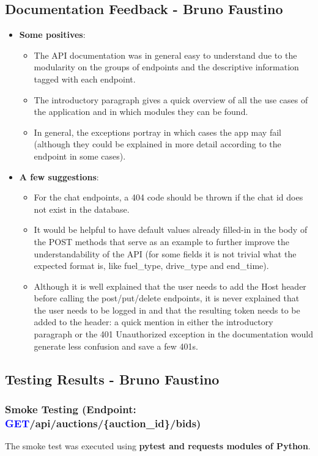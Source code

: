 \documentclass[11pt,a4paper]{article}
\newcommand{\getapi}{\textcolor{blue}{GET}}
\newcommand{\bff}[1]{\textbf{#1}}
\begin{document}
 \subsection{Documentation Feedback - Bruno Faustino}
 \begin{itemize}
  \item \bff{Some positives}:
  \begin{itemize}
   \item The API documentation was in general easy to understand due to the modularity on the groups of endpoints and the descriptive information tagged with each endpoint.
   \item The introductory paragraph gives a quick overview of all the use cases of the application and in which modules they can be found.
   \item In general, the exceptions portray in which cases the app may fail (although they could be explained in more detail according to the endpoint in some cases).
  \end{itemize}
  \item \bff{A few suggestions}:
  \begin{itemize}
   \item For the chat endpoints, a 404 code should be thrown if the chat id does not exist in the database.
   \item It would be helpful to have default values already filled-in in the body of the POST methods that serve as an example to further improve the understandability of the API (for some fields it is not trivial what the expected format is, like fuel\_type, drive\_type and end\_time).
   \item Although it is well explained that the user needs to add the Host header before calling the post/put/delete endpoints, it is never explained that the user needs to be logged in and that the resulting token needs to be added to the header: a quick mention in either the introductory paragraph or the 401 Unauthorized exception in the documentation would generate less confusion and save a few 401s.
  \end{itemize}
 \end{itemize}
 
 \subsection{Testing Results - Bruno Faustino}
 
 \subsubsection{Smoke Testing (Endpoint: \getapi /api/auctions/\{auction\_id\}/bids)}
 The smoke test was executed using \bff{pytest and requests modules of Python}.
 
\end{document}
